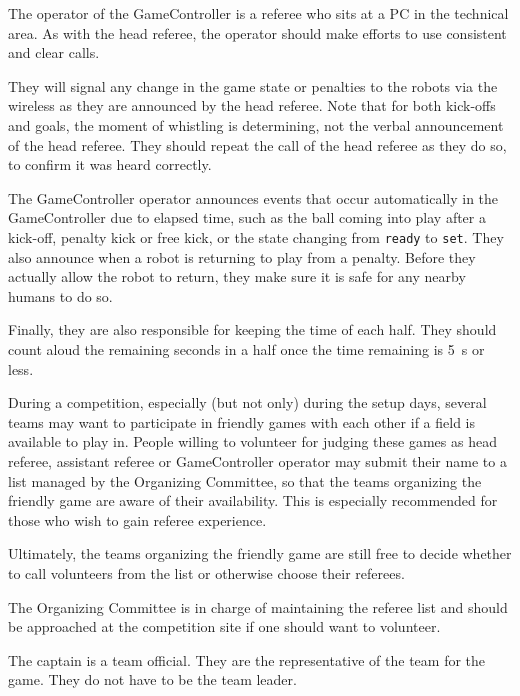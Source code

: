 \label{sec:gamecontroller_operator}

The operator of the GameController is a referee who sits at a PC in the technical area. As with the head referee, the operator should make efforts to use consistent and clear calls.

They will signal any change in the game state or penalties to the robots via the wireless as they are announced by the head referee. Note that for both kick-offs and goals, the moment of whistling is determining, not the verbal announcement of the head referee. They should repeat the call of the head referee as they do so, to confirm it was heard correctly.

The GameController operator announces events that occur automatically in the GameController due to elapsed time, such as the ball coming into play after a kick-off, penalty kick or free kick, or the state changing from \texttt{ready} to \texttt{set}. They also announce when a robot is returning to play from a penalty. Before they actually allow the robot to return, they make sure it is safe for any nearby humans to do so.

Finally, they are also responsible for keeping the time of each half. They should count aloud the remaining seconds in a half once the time remaining is \qty{5}{\second} or less.

\label{sec:referee_list}

During a competition, especially (but not only) during the setup days, several teams may want to participate in friendly games with each other if a field is available to play in. People willing to volunteer for judging these games as head referee, assistant referee or GameController operator may submit their name to a list managed by the Organizing Committee, so that the teams organizing the friendly game are aware of their availability. This is especially recommended for those who wish to gain referee experience.

Ultimately, the teams organizing the friendly game are still free to decide whether to call volunteers from the list or otherwise choose their referees.

The Organizing Committee is in charge of maintaining the referee list and should be approached at the competition site if one should want to volunteer.


The captain is a team official. They are the representative of the team for the game. They do not have to be the team leader.

